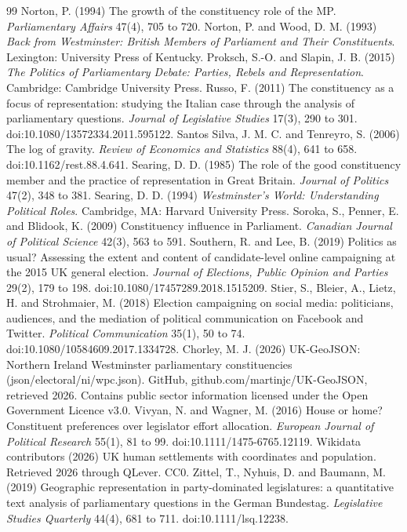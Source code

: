 \documentclass[11pt,a4paper]{article}
\begin{document}
\begin{thebibliography}{99}
 Norton, P. (1994) The growth of the constituency role of the MP. \textit{Parliamentary Affairs} 47(4), 705 to 720.
 Norton, P. and Wood, D. M. (1993) \textit{Back from Westminster: British Members of Parliament and Their Constituents}. Lexington: University Press of Kentucky.
 Proksch, S.-O. and Slapin, J. B. (2015) \textit{The Politics of Parliamentary Debate: Parties, Rebels and Representation}. Cambridge: Cambridge University Press.
 Russo, F. (2011) The constituency as a focus of representation: studying the Italian case through the analysis of parliamentary questions. \textit{Journal of Legislative Studies} 17(3), 290 to 301. doi:10.1080/13572334.2011.595122.
 Santos Silva, J. M. C. and Tenreyro, S. (2006) The log of gravity. \textit{Review of Economics and Statistics} 88(4), 641 to 658. doi:10.1162/rest.88.4.641.
 Searing, D. D. (1985) The role of the good constituency member and the practice of representation in Great Britain. \textit{Journal of Politics} 47(2), 348 to 381.
 Searing, D. D. (1994) \textit{Westminster's World: Understanding Political Roles}. Cambridge, MA: Harvard University Press.
 Soroka, S., Penner, E. and Blidook, K. (2009) Constituency influence in Parliament. \textit{Canadian Journal of Political Science} 42(3), 563 to 591.
 Southern, R. and Lee, B. (2019) Politics as usual? Assessing the extent and content of candidate-level online campaigning at the 2015 UK general election. \textit{Journal of Elections, Public Opinion and Parties} 29(2), 179 to 198. doi:10.1080/17457289.2018.1515209.
 Stier, S., Bleier, A., Lietz, H. and Strohmaier, M. (2018) Election campaigning on social media: politicians, audiences, and the mediation of political communication on Facebook and Twitter. \textit{Political Communication} 35(1), 50 to 74. doi:10.1080/10584609.2017.1334728.
 Chorley, M. J. (2026) UK-GeoJSON: Northern Ireland Westminster parliamentary constituencies (json/electoral/ni/wpc.json). GitHub, github.com/martinjc/UK-GeoJSON, retrieved 2026. Contains public sector information licensed under the Open Government Licence v3.0.
 Vivyan, N. and Wagner, M. (2016) House or home? Constituent preferences over legislator effort allocation. \textit{European Journal of Political Research} 55(1), 81 to 99. doi:10.1111/1475-6765.12119.
 Wikidata contributors (2026) UK human settlements with coordinates and population. Retrieved 2026 through QLever. CC0.
 Zittel, T., Nyhuis, D. and Baumann, M. (2019) Geographic representation in party-dominated legislatures: a quantitative text analysis of parliamentary questions in the German Bundestag. \textit{Legislative Studies Quarterly} 44(4), 681 to 711. doi:10.1111/lsq.12238.
\end{thebibliography}
\end{document}
